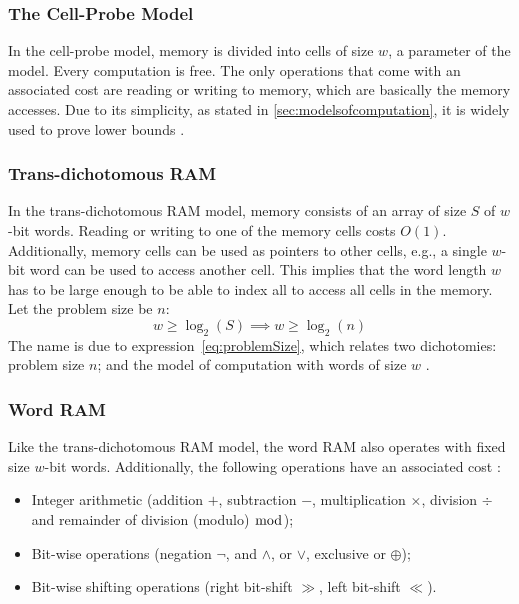 \subsubsection{The Cell-Probe Model}
In the cell-probe model, memory is divided into cells of size $w$, a parameter of the model. Every computation is free.
The only operations that come with an associated cost are reading or writing to memory, which are basically the memory accesses.
Due to its simplicity, as stated in \ref{sec:modelsofcomputation}, it is widely used to prove lower bounds \cite{erikdemainelec11}.

\subsubsection{Trans-dichotomous RAM}
In the trans-dichotomous RAM model, memory consists of an array of size $S$ of $w$-bit words.
Reading or writing to one of the memory cells costs $O(1)$.
Additionally, memory cells can be used as pointers to other cells, e.g., a single $w$-bit word can be used to access another cell.
This implies that the word length $w$ has to be large enough to be able to index all to access all cells in the memory.
Let the problem size be $n$:
\begin{equation}\label{eq:problemSize}
    w \ge \log_2(S) \implies w \ge \log_2(n)
\end{equation}
The name is due to expression~\ref{eq:problemSize}, which relates two dichotomies: problem size $n$; and the model of computation with words of size $w$ \cite{erikdemainelec11}. 

\subsubsection{Word RAM}
Like the trans-dichotomous RAM model, the word RAM also operates with fixed size $w$-bit words. Additionally, the following operations have an associated cost \cite{nelsonjelanilec1}:
\begin{itemize}
    \item Integer arithmetic (addition $+$, subtraction $-$, multiplication $\times$, division $\div$ and remainder of division (modulo) $\bmod$);
    \item Bit-wise operations (negation $\neg$, and $\wedge$, or $\vee$, exclusive or $\oplus$);
    \item Bit-wise shifting operations (right bit-shift $\gg$, left bit-shift $\ll$).
\end{itemize}

